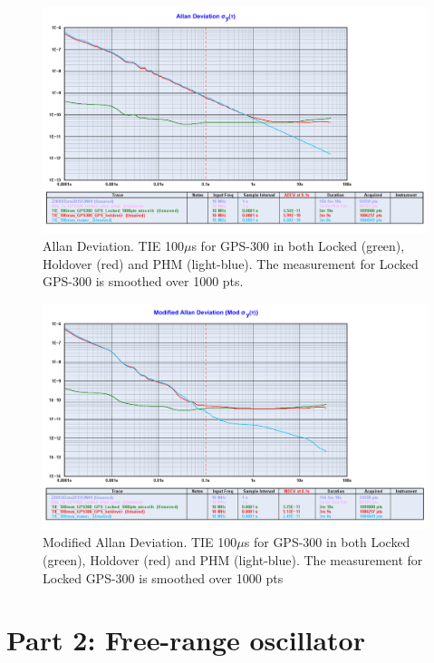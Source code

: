 \documentclass[11pt,english,a4paper]{article}
\begin{document}
\begin{figure}[!htb]
  \centering
    \includegraphics[width=1\textwidth]{del_1_spm6_allan.png}
      \caption{Allan Deviation. TIE 100$\mu$s for GPS-300 in both Locked (green), Holdover (red) and PHM (light-blue). The measurement for Locked GPS-300 is smoothed over 1000 pts.}
          \label{fig:del_1_spm6_allan}
\end{figure}

\begin{figure}[!htb]
  \centering
    \includegraphics[width=1\textwidth]{del_1_spm6_mod_allan.png}
      \caption{Modified Allan Deviation. TIE 100$\mu$s for GPS-300 in both Locked (green), Holdover (red) and PHM (light-blue). The measurement for Locked GPS-300 is smoothed over 1000 pts}
          \label{fig:del_1_spm6_mod_allan}
\end{figure}

\section{Part 2: Free-range oscillator}
\end{document}
